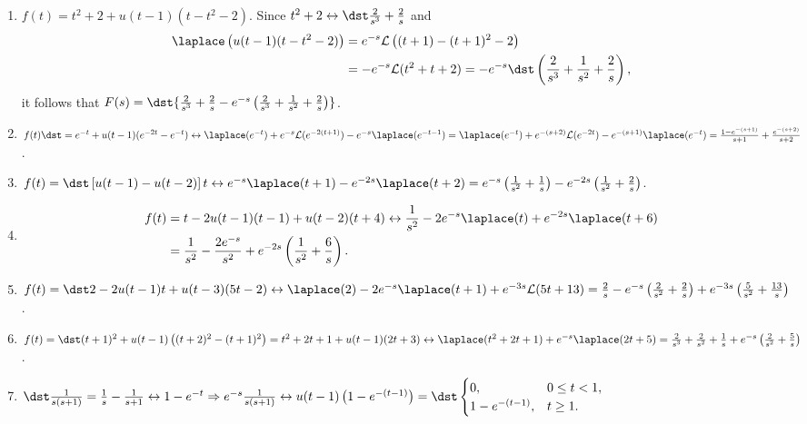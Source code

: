 \documentclass[openany]{book}
\newenvironment{sectionSolutions}{
 \begin{enumerate}[item-label={\thesection.\arabic{enumi}.}]
}{
 \end{enumerate}
}
\begin{document}
\begin{sectionSolutions}
\item
$f(t)=t^2+2+u(t-1)(t-t^2-2)$.
Since $t^2+2\leftrightarrow\dst\frac{2}{ s^3}+\frac{2}{ s}$  and
\begin{align*}
\laplace \left(u(t-1)(t-t^2-2)\right)&=e^{-s}{\cal
L}\left((t+1)-(t+1)^2-2\right)\\&=-e^{-s}{\cal
L}(t^2+t+2)=-e^{-s}\dst\left(\frac{2}{ s^3}+\frac{1}{
s^2}+\frac{2}{ s}\right),
\end{align*}
it follows that $F(s)=\dst{\frac{2}{ s^3} +\frac{2}{
s}-e^{-s}\left(\frac{2}{ s^3}+\frac{1}{ s^2}+\frac{2 }{ s}\right)}$.


\item
$f(t)\dst=e^{-t}+u(t-1)(e^{-2t}-e^{-t})
\leftrightarrow \laplace (e^{-t})+e^{-s}{\cal
L}(e^{-2(t+1)})-e^{-s}\laplace (e^{-t-1})=
 \laplace (e^{-t})+e^{-(s+2)}{\cal
L}(e^{-2t})-e^{-(s+1)}\laplace (e^{-t})=
\frac{1-e^{-(s+1)}}{ s+1}+\frac{e^{-(s+2)}}{ s+2}$.


\item
$f(t)=\dst\left[u(t-1)-u(t-2)\right]t\leftrightarrow
e^{-s}\laplace (t+1)-e^{-2s}\laplace (t+2)=
e^{-s}\left(\frac{1}{ s^2}+\frac{1}{ s}\right)-e^{-2s}\left(\frac{1}{ s^2}
+\frac{2}{ s}\right)$.


\item
\begin{align*}
f(t)&=t-2u(t-1)(t-1)+u(t-2)(t+4)\leftrightarrow
   \frac{1}{ s^2}-2e^{-s}\laplace (t)+e^{-2s}\laplace (t+6)\\
  &=\frac{1}{ s^2}-\frac{2e^{-s}}{ s^2}
+e^{-2s}\left(\frac{1}{ s^2}+\frac{6}{ s}\right).
\end{align*}




\item
$f(t)=\dst2-2u(t-1)t+u(t-3)(5t-2)
\leftrightarrow \laplace (2)-2e^{-s}\laplace (t+1)+e^{-3s}{\cal
L}(5t+13)=
\frac{2}{ s}-e^{-s}\left(\frac{2}{ s^2}+\frac{2}{
s}\right)+e^{-3s}\left(\frac{5}{ s^2}+\frac{13}{ s}\right)$.



\item
$f(t)=\dst(t+1)^2+u(t-1)\left((t+2)^2-(t+1)^2\right)
=t^2+2t+1+u(t-1)(2t+3)
\leftrightarrow
\laplace (t^2+2t+1)+e^{-s}\laplace (2t+5)=
\frac{2}{ s^3 }+\frac{2}{ s^2}+\frac{1}{ s}+e^{-s}\left(\frac{2}{
s^2}+\frac{5}{ s}\right)$.


\item
$\dst\frac{1}{ s(s+1)}=\frac{1}{ s}-\frac{1}{ s+1}\leftrightarrow
 1-e^{-t}
\Rightarrow
e^{-s}\frac{1}{ s(s+1)}\leftrightarrow
u(t-1)\left(1-e^{-(t-1)}\right)=
\dst\begin{cases} 0,&0\le t<1,\\
1-e^{-(t-1)},&t\ge1.\end{cases}$



\end{sectionSolutions}
\end{document}

